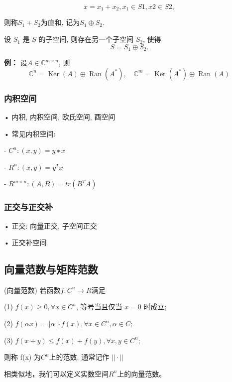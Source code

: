\documentclass[12pt,a4paper]{article}
\begin{document}
$$x = x_1 + x_2, x_1 ∈ S1, x2 ∈ S2,$$

则称$S_1 + S_2$为直和, 记为$S_1 ⊕ S_2$.


\begin{theorem}
	
	设 $S_1$ 是 $S$ 的子空间, 则存在另一个子空间 $S_2$, 使得$$S = S_1 ⊕ S_2.$$
	
\end{theorem}




{\bfseries  例：} \quad 设$A ∈\mathbb{C}^{m×n}$, 则
$$\mathbb{C}^{n}=\operatorname{Ker}(A) \oplus \operatorname{Ran}\left(A^{*}\right), \quad \mathbb{C}^{m}=\operatorname{Ker}\left(A^{*}\right) \oplus \operatorname{Ran}(A)$$ 



\subsubsection{内积空间}
• 内积, 内积空间, 欧氏空间, 酉空间

• 常见内积空间:

\qquad - $C^{n} : (x, y) = y∗x$

\qquad - $R^{n} : (x, y) = y^{T}x$

\qquad - $R^{m×n} : (A, B) = tr(B^{T}A)$

\subsubsection{正交与正交补}

• 正交: 向量正交, 子空间正交

• 正交补空间

\subsection{向量范数与矩阵范数}

\begin{definition}(向量范数)
	若函数$f : C^n → R $满足
	
	(1) $f(x) ≥ 0, ∀ x ∈ C^n$, 等号当且仅当 $x = 0$ 时成立;
	
	(2) $f(αx) = |α| · f(x), ∀ x ∈ C^{n}, α ∈ C;$
	
	(3) $f(x + y) ≤ f(x) + f(y), ∀x, y ∈ C^{n};$
	
	则称 f(x) 为$C^{n}$上的范数, 通常记作 $||·||$
\end{definition}

相类似地，我们可以定义实数空间$R^n$上的向量范数。
\end{document}
